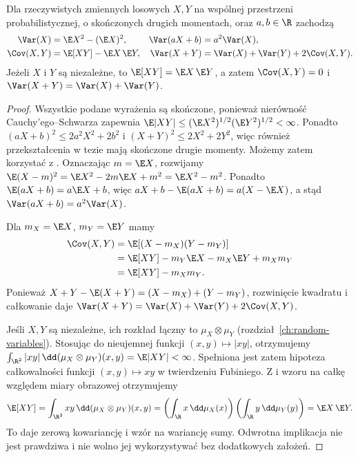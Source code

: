 \begin{stwierdzenie}
Dla rzeczywistych zmiennych losowych $X,Y$ na wspólnej
przestrzeni probabilistycznej, o skończonych drugich
momentach, oraz $a,b\in\R$ zachodzą
\begin{align*}
\Var(X)&=\E X^2-(\E X)^2, &
\Var(aX+b)&=a^2\Var(X),\\
\Cov(X,Y)&=\E[XY]-\E X\,\E Y, &
\Var(X+Y)&=\Var(X)+\Var(Y)+2\Cov(X,Y).
\end{align*}
Jeżeli $X$ i $Y$ są niezależne, to $\E[XY]=\E X\,\E Y$,
a zatem $\Cov(X,Y)=0$ i $\Var(X+Y)=\Var(X)+\Var(Y)$.
\end{stwierdzenie}
\begin{proof}
Wszystkie podane wyrażenia są skończone,
ponieważ nierówność Cauchy'ego--Schwarza zapewnia
$\E|XY|\leq(\E X^2)^{1/2}(\E Y^2)^{1/2}<\infty$.
Ponadto $(aX+b)^2\leq2a^2X^2+2b^2$ i
$(X+Y)^2\leq2X^2+2Y^2$, więc również przekształcenia
w tezie mają skończone drugie momenty.
Możemy zatem korzystać z
.
Oznaczając $m=\E X$, rozwijamy
$\E(X-m)^2=\E X^2-2m\E X+m^2=\E X^2-m^2$.
Ponadto $\E(aX+b)=a\E X+b$, więc
$aX+b-\E(aX+b)=a(X-\E X)$,
a stąd $\Var(aX+b)=a^2\Var(X)$.

Dla $m_X=\E X$, $m_Y=\E Y$ mamy
\[
\begin{aligned}
\Cov(X,Y)
&=\E[(X-m_X)(Y-m_Y)]\\
&=\E[XY]-m_Y\E X-m_X\E Y+m_Xm_Y\\
&=\E[XY]-m_Xm_Y.
\end{aligned}
\]
Ponieważ
$X+Y-\E(X+Y)=(X-m_X)+(Y-m_Y)$,
rozwinięcie kwadratu i całkowanie daje
$\Var(X+Y)=\Var(X)+\Var(Y)+2\Cov(X,Y)$.

Jeśli $X,Y$ są niezależne, ich rozkład łączny to
$\mu_X\otimes\mu_Y$ (rozdział~\ref{ch:random-variables}).
Stosując 
do nieujemnej funkcji $(x,y)\mapsto|xy|$, otrzymujemy
$\int_{\R^2}|xy|\,\dd(\mu_X\otimes\mu_Y)(x,y)
=\E|XY|<\infty$. Spełniona jest zatem hipoteza całkowalności
funkcji $(x,y)\mapsto xy$ w twierdzeniu Fubiniego. Z 
i wzoru na całkę względem miary obrazowej otrzymujemy
\[
\E[XY]=\int_{\R^2}xy\,\dd(\mu_X\otimes\mu_Y)(x,y)
=\left(\int_\R x\,\dd\mu_X(x)\right)
 \left(\int_\R y\,\dd\mu_Y(y)\right)
=\E X\,\E Y.
\]
To daje zerową kowariancję i wzór na wariancję sumy.
Odwrotna implikacja nie jest prawdziwa i nie wolno
jej wykorzystywać bez dodatkowych założeń.
\end{proof}

